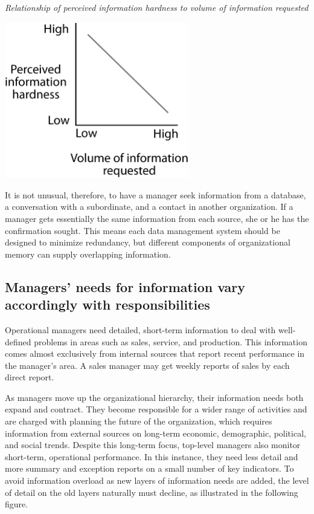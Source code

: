\documentclass[
]{article}
\begin{document}
\emph{Relationship of perceived information hardness to volume of information
requested}

\includegraphics[width=3.16667in,height=\textheight]{Figures/Chapter 2/hardness-volume tradeoff.png}

It is not unusual, therefore, to have a manager seek information from a
database, a conversation with a subordinate, and a contact in another
organization. If a manager gets essentially the same information from
each source, she or he has the confirmation sought. This means each data
management system should be designed to minimize redundancy, but
different components of organizational memory can supply overlapping
information.

\hypertarget{managers-needs-for-information-vary-accordingly-with-responsibilities}{%
\subsection*{Managers' needs for information vary accordingly with responsibilities}\label{managers-needs-for-information-vary-accordingly-with-responsibilities}}

Operational managers need detailed, short-term information to deal with
well-defined problems in areas such as sales, service, and production.
This information comes almost exclusively from internal sources that
report recent performance in the manager's area. A sales manager may get
weekly reports of sales by each direct report.

As managers move up the organizational hierarchy, their information
needs both expand and contract. They become responsible for a wider
range of activities and are charged with planning the future of the
organization, which requires information from external sources on
long-term economic, demographic, political, and social trends. Despite
this long-term focus, top-level managers also monitor short-term,
operational performance. In this instance, they need less detail and
more summary and exception reports on a small number of key indicators.
To avoid information overload as new layers of information needs are
added, the level of detail on the old layers naturally must decline, as
illustrated in the following figure.
\end{document}
